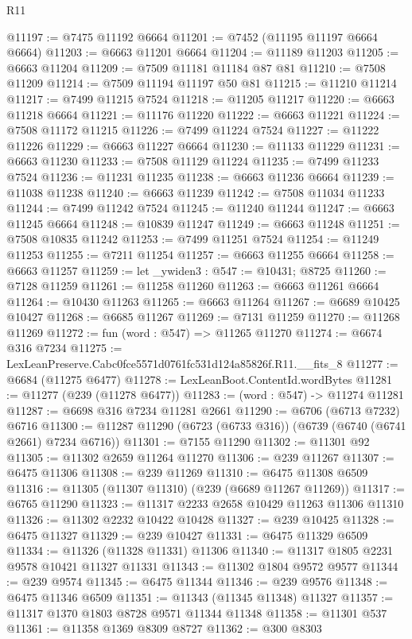 \begin{lexlean}{R11}
\begin{coremodule}
@11197 := @7475 @11192 @6664
@11201 := @7452 (@11195 @11197 @6664 @6664)
@11203 := @6663 @11201 @6664
@11204 := @11189 @11203
@11205 := @6663 @11204
@11209 := @7509 @11181 @11184 @87 @81
@11210 := @7508 @11209
@11214 := @7509 @11194 @11197 @50 @81
@11215 := @11210 @11214
@11217 := @7499 @11215 @7524
@11218 := @11205 @11217
@11220 := @6663 @11218 @6664
@11221 := @11176 @11220
@11222 := @6663 @11221
@11224 := @7508 @11172 @11215
@11226 := @7499 @11224 @7524
@11227 := @11222 @11226
@11229 := @6663 @11227 @6664
@11230 := @11133 @11229
@11231 := @6663 @11230
@11233 := @7508 @11129 @11224
@11235 := @7499 @11233 @7524
@11236 := @11231 @11235
@11238 := @6663 @11236 @6664
@11239 := @11038 @11238
@11240 := @6663 @11239
@11242 := @7508 @11034 @11233
@11244 := @7499 @11242 @7524
@11245 := @11240 @11244
@11247 := @6663 @11245 @6664
@11248 := @10839 @11247
@11249 := @6663 @11248
@11251 := @7508 @10835 @11242
@11253 := @7499 @11251 @7524
@11254 := @11249 @11253
@11255 := @7211 @11254
@11257 := @6663 @11255 @6664
@11258 := @6663 @11257
@11259 := let _ywiden3 : @547 := @10431; @8725
@11260 := @7128 @11259
@11261 := @11258 @11260
@11263 := @6663 @11261 @6664
@11264 := @10430 @11263
@11265 := @6663 @11264
@11267 := @6689 @10425 @10427
@11268 := @6685 @11267
@11269 := @7131 @11259
@11270 := @11268 @11269
@11272 := fun (word : @547) => @11265 @11270
@11274 := @6674 @316 @7234
@11275 := LexLeanPreserve.Cabc0fce5571d0761fc531d124a85826f.R11.__fits_8
@11277 := @6684 (@11275 @6477)
@11278 := LexLeanBoot.ContentId.wordBytes
@11281 := @11277 (@239 (@11278 @6477))
@11283 := (word : @547) -> @11274 @11281
@11287 := @6698 @316 @7234 @11281 @2661
@11290 := @6706 (@6713 @7232) @6716
@11300 := @11287 @11290 (@6723 (@6733 @316)) (@6739 (@6740 (@6741 @2661) @7234 @6716))
@11301 := @7155 @11290
@11302 := @11301 @92
@11305 := @11302 @2659 @11264 @11270
@11306 := @239 @11267
@11307 := @6475 @11306
@11308 := @239 @11269
@11310 := @6475 @11308 @6509
@11316 := @11305 (@11307 @11310) (@239 (@6689 @11267 @11269))
@11317 := @6765 @11290
@11323 := @11317 @2233 @2658 @10429 @11263 @11306 @11310
@11326 := @11302 @2232 @10422 @10428
@11327 := @239 @10425
@11328 := @6475 @11327
@11329 := @239 @10427
@11331 := @6475 @11329 @6509
@11334 := @11326 (@11328 @11331) @11306
@11340 := @11317 @1805 @2231 @9578 @10421 @11327 @11331
@11343 := @11302 @1804 @9572 @9577
@11344 := @239 @9574
@11345 := @6475 @11344
@11346 := @239 @9576
@11348 := @6475 @11346 @6509
@11351 := @11343 (@11345 @11348) @11327
@11357 := @11317 @1370 @1803 @8728 @9571 @11344 @11348
@11358 := @11301 @537
@11361 := @11358 @1369 @8309 @8727
@11362 := @300 @8303

\end{coremodule}
\end{lexlean}
